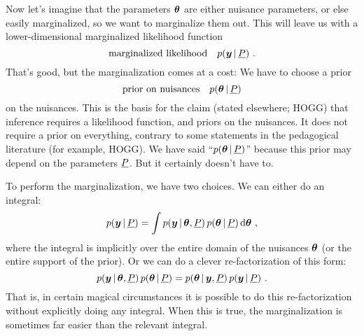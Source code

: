 Now let's imagine that the parameters $\boldsymbol{\theta}$ are either nuisance
parameters, or else easily marginalized, so we want to marginalize
them out.
This will leave us with a lower-dimensional marginalized likelihood
function
\begin{equation}
\mbox{marginalized likelihood} \quad p(\boldsymbol{y}\,|\,\underline{P})
~ .
\end{equation}
That's good, but the marginalization comes at a cost:
We have to choose a prior
\begin{equation}
\mbox{prior on nuisances} \quad p(\boldsymbol{\theta}\,|\,\underline{P})
\end{equation}
on the nuisances.
This is the basis for the claim (stated elsewhere; HOGG) that
inference requires a likelihood function, and priors on the nuisances.
It does not require a prior on everything, contrary to some statements
in the pedagogical literature (for example, HOGG).
We have said ``$p(\boldsymbol{\theta}\,|\,\underline{P})$'' because this prior may depend on
the parameters $\underline{P}$. But it certainly doesn't have to.

To perform the marginalization, we have two choices.
We can either do an integral:
\begin{equation}
p(\boldsymbol{y}\,|\,\underline{P}) = \int p(\boldsymbol{y}\,|\,\boldsymbol{\theta},\underline{P})\,p(\boldsymbol{\theta}\,|\,\underline{P})\,\mathrm{d}\boldsymbol{\theta}
~ ,
\end{equation}
where the integral is implicitly over the entire domain of the
nuisances $\boldsymbol{\theta}$ (or the entire support of the prior).
Or we can do a clever re-factorization of this form:
\begin{equation}
p(\boldsymbol{y}\,|\,\boldsymbol{\theta},\underline{P})\,p(\boldsymbol{\theta}\,|\,\underline{P})
 = p(\boldsymbol{\theta}\,|\,\boldsymbol{y},\underline{P})\,p(\boldsymbol{y}\,|\,\underline{P})
~ .
\end{equation}
That is, in certain magical circumstances it is possible to do this
re-factorization without explicitly doing any integral.
When this is true, the marginalization is sometimes far easier than
the relevant integral.

